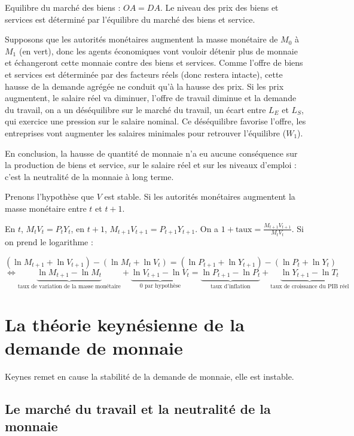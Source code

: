 	Equilibre du marché des biens : $OA = DA$. Le niveau des prix des biens et services est déterminé par l'équilibre du marché des biens et service.
	
	Supposons que les autorités monétaires augmentent la masse monétaire de $M_0$ à $M_1$ (en vert), donc les agents économiques vont vouloir détenir plus de monnaie et échangeront cette monnaie contre des biens et services. Comme l'offre de biens et services est déterminée par des facteurs réels (donc restera intacte), cette hausse de la demande agrégée ne conduit qu'à la hausse des prix. Si les prix augmentent, le salaire réel va diminuer, l'offre de travail diminue et la demande du travail, on a un déséquilibre sur le marché du travail, un écart entre $L_E$ et $L_S$, qui exercice une pression sur le salaire nominal. Ce déséquilibre favorise l'offre, les entreprises vont augmenter les salaires minimales pour retrouver l'équilibre ($W_1$).
	
	En conclusion, la hausse de quantité de monnaie n'a eu aucune conséquence sur la production de biens et service, sur le salaire réel et sur les niveaux d'emploi : c'est la neutralité de la monnaie à long terme.
	
	
	Prenons l'hypothèse que $V$ est stable. Si les autorités monétaires augmentent la masse monétaire entre $t$ et $t + 1$.
	
	En $t$, $M_t V_t = P_t Y_t$, en $t + 1$, $M_{t + 1} V_{t + 1} = P_{t + 1} Y_{t + 1}$. On a $1 + \text{taux} = \frac{M_{t + 1} V_{t + 1}}{M_t V_t}$. Si on prend le logarithme :
	
	$$(\ln M_{t + 1} + \ln V_{t + 1}) - (\ln M_t + \ln V_t) = (\ln P_{t + 1} + \ln Y_{t + 1}) - (\ln P_t + \ln Y_t)$$
	$$\Leftrightarrow \underbrace{\ln M_{t + 1} - \ln M_t}_{\text{taux de variation de la masse monétaire}} + \underbrace{\ln V_{t + 1} - \ln V_t}_{0\text{ par hypothèse}} = \underbrace{\ln P_{t + 1} -\ln P_t}_{\text{taux d'inflation}} + \underbrace{\ln Y_{t + 1} - \ln T_t}_{\text{taux de croissance du PIB réel}}$$

\section{La théorie keynésienne de la demande de monnaie}

	Keynes remet en cause la stabilité de la demande de monnaie, elle est instable.
	
	\subsection{Le marché du travail et la neutralité de la monnaie}
	
